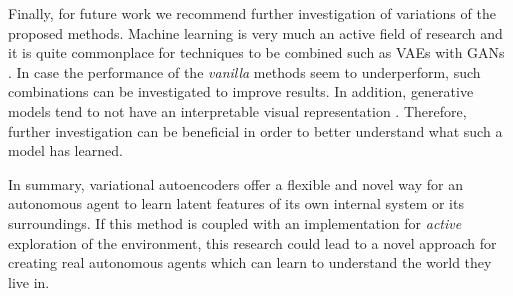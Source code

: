\documentclass[main.tex]{subfiles}
\begin{document}
Finally, for future work we recommend further investigation of variations of the proposed methods. Machine learning is very much an active field of research and it is quite commonplace for techniques to be combined such as VAEs with GANs \cite{mescheder2017adversarial,hu2017unifying}. In case the performance of the \textit{vanilla} methods seem to underperform, such combinations can be investigated to improve results. In addition, generative models tend to not have an interpretable visual representation \cite{feichtenhofer2018have}. Therefore, further investigation can be beneficial in order to better understand what such a model has learned.

In summary, variational autoencoders offer a flexible and novel way for an autonomous agent to learn latent features of its own internal system or its surroundings. If this method is coupled with an implementation for \textit{active} exploration of the environment, this research could lead to a novel approach for creating real autonomous agents which can learn to understand the world they live in.

\newpage
\renewcommand\bibname{References}


\end{document}
